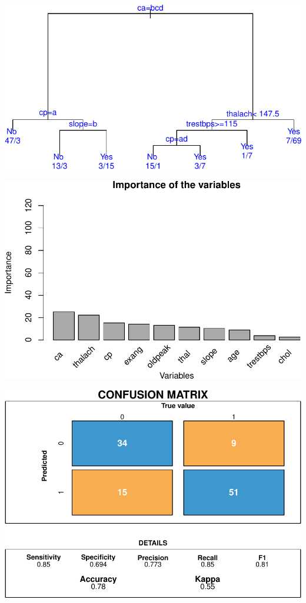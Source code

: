 \documentclass[]{article}
\begin{document}
\includegraphics{project_report_files/figure-latex/unnamed-chunk-32-1.pdf}

\includegraphics{project_report_files/figure-latex/unnamed-chunk-33-1.pdf}

\includegraphics{project_report_files/figure-latex/unnamed-chunk-34-1.pdf}
\end{document}

